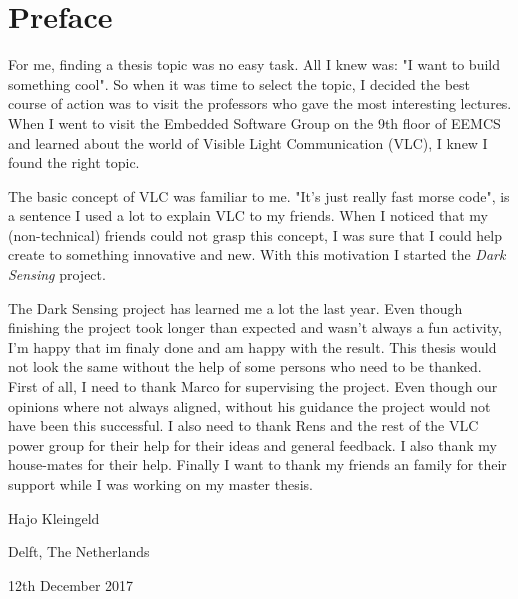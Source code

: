 \chapter*{Preface}
For me, finding a thesis topic was no easy task. All I knew was: "I want to build something cool". So when it was time to select the topic, I decided the best course of action was to visit the professors who gave the most interesting lectures. When I went to visit the Embedded Software Group on the 9th floor of EEMCS and learned about the world of Visible Light Communication (VLC), I knew I found the right topic.

The basic concept of VLC was familiar to me. "It's just really fast morse code", is a sentence I used a lot to explain VLC to my friends. When I noticed that my (non-technical) friends could not grasp this concept, I was sure that I could help create to something innovative and new. With this motivation I started the \textit{Dark Sensing} project.

\vspace{1\baselineskip}

\noindent
The Dark Sensing project has learned me a lot the last year. Even though finishing the project took longer than expected and wasn't always a fun activity, I'm happy that im finaly done and am happy with the result. This thesis would not look the same without the help of some persons who need to be thanked. First of all, I need to thank Marco for supervising the project. Even though our opinions where not always aligned, without his guidance the project would not have been this successful. I also need to thank Rens and the rest of the VLC power group for their help for their ideas and general feedback. I also thank my house-mates for their help. Finally I want to thank my friends an family for their support while I was working on my master thesis.

\vspace{1\baselineskip}

\noindent
Hajo Kleingeld

\vspace{1\baselineskip}

\noindent
Delft, The Netherlands

\noindent
12th December 2017
